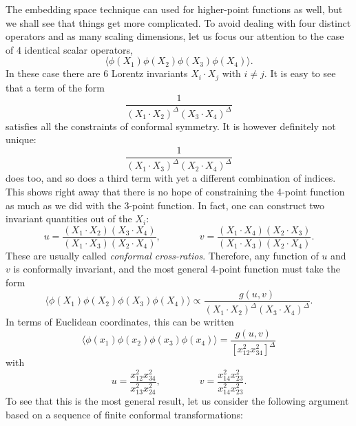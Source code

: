 \documentclass[a4paper,12pt]{article}
\numberwithin{equation}{section}
\begin{document}
The embedding space technique can used for higher-point functions as well, but we shall see that things get more complicated.
To avoid dealing with four distinct operators and as many scaling dimensions, let us focus our attention to the case of 4 identical scalar operators,
\begin{equation}
	\langle \phi(X_1) \phi(X_2) \phi(X_3) \phi(X_4) \rangle.
\end{equation}
In these case there are 6 Lorentz invariants $X_i \cdot X_j$ with $i \neq j$. It is easy to see that a term of the form
\begin{equation}
	\frac{1}{(X_1 \cdot X_2)^\Delta (X_3 \cdot X_4)^\Delta}
\end{equation}
satisfies all the constraints of conformal symmetry. It is however definitely not unique: 
\begin{equation}
	\frac{1}{(X_1 \cdot X_3)^\Delta (X_2 \cdot X_4)^\Delta}
\end{equation}
does too, and so does a third term with yet a different combination of indices. This shows right away that there is no hope of constraining the 4-point function as much as we did with the 3-point function.
In fact, one can construct two invariant quantities out of the $X_i$:
\begin{equation}
	u = \frac{(X_1 \cdot X_2) (X_3 \cdot X_4)}
	{(X_1 \cdot X_3) (X_2 \cdot X_4)},
	\qquad\qquad
	v = \frac{(X_1 \cdot X_4) (X_2 \cdot X_3)}
	{(X_1 \cdot X_3) (X_2 \cdot X_4)}.
\end{equation}
These are usually called \emph{conformal cross-ratios}. 
Therefore, any function of $u$ and $v$ is conformally invariant, and the most general 4-point function must take the form
\begin{equation}
	\langle \phi(X_1) \phi(X_2) \phi(X_3) \phi(X_4) \rangle
	\propto
	\frac{g(u,v)}{(X_1 \cdot X_2)^\Delta (X_3 \cdot X_4)^\Delta}.
\end{equation}
In terms of Euclidean coordinates, this can be written
\begin{equation}
	\langle \phi(x_1) \phi(x_2) \phi(x_3) \phi(x_4) \rangle
	= \frac{g(u,v)}{\left[ x_{12}^2 x_{34}^2 \right]^\Delta}
	\label{eq:4pt}
\end{equation}
with
\begin{equation}
	u = \frac{x_{12}^2 x_{34}^2}{x_{13}^2 x_{24}^2},
	\qquad\qquad
	v = \frac{x_{14}^2 x_{23}^2}{x_{14}^2 x_{23}^2}.
	\label{eq:crossratios}
\end{equation}
To see that this is the most general result, let us consider the following argument based on a sequence of finite conformal transformations:
\end{document}
